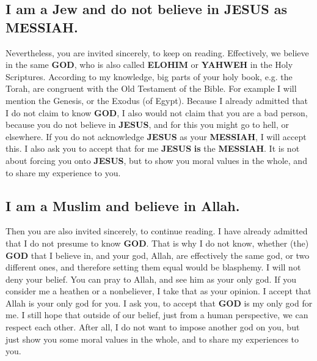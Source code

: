 \documentclass[12pt,a4paper]{article}
\newcommand{\God}[0]{\textbf{GOD}}
\newcommand{\Elohim}[0]{\textbf{ELOHIM}}
\newcommand{\Jesus}[0]{\textbf{JESUS}}
\newcommand{\Messiah}[0]{\textbf{MESSIAH}}
\newcommand{\Yahweh}[0]{\textbf{YAHWEH}}
\begin{document}
	\subsection{I am a Jew and do not believe in {\Jesus} as {\Messiah}.}
		Nevertheless,
		you are invited sincerely,
		to keep on reading.
		Effectively,
		we believe in the same {\God},
		who is also called {\Elohim} or {\Yahweh} in the Holy Scriptures.
		According to my knowledge,
		big parts of your holy book,
		e.g. the Torah,
		are congruent with the Old Testament of the Bible.
		For example I will mention the Genesis,
		or the Exodus (of Egypt).
		Because I already admitted that I do not claim to know {\God},
		I also would not claim that you are a bad person,
		because you do not believe in {\Jesus},
		and for this you might go to hell,
		or elsewhere.
		If you do not acknowledge {\Jesus} as your {\Messiah},
		I will accept this.
		I also ask you to accept that for me {\Jesus} \textbf{is} the {\Messiah}.
		It is not about forcing you onto {\Jesus},
		but to show you moral values in the whole,
		and to share my experience to you.
		
	\subsection{I am a Muslim and believe in Allah.}
		Then you are also invited sincerely,
		to continue reading.
		I have already admitted
		that I do not presume to know {\God}.
		That is why I do not know,
		whether (the) {\God} that I believe in,
		and your god,
		Allah,
		are effectively the same god,
		or two different ones,
		and therefore setting them equal would be blasphemy.
		I will not deny your belief.
		You can pray to Allah,
		and see him as your only god.
		If you consider me a heathen or a nonbeliever,
		I take that as your opinion.
		I accept that Allah is your only god for you.
		I ask you,
		to accept that {\God} is my only god for me.
		I still hope that outside of our belief,
		just from a human perspective,
		we can respect each other.
		After all,
		I do not want to impose another god on you,
		but just show you some moral values in the whole,
		and to share my experiences to you.
	
\end{document}
